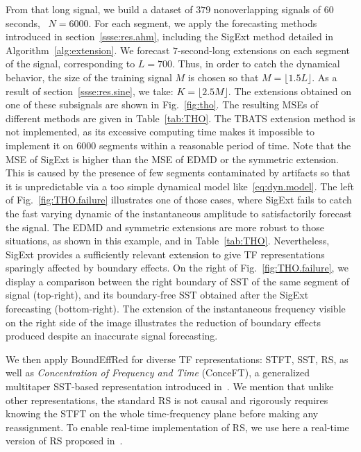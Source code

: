 From that long signal, we build a dataset of $379$ non\-overlapping signals of 60 seconds, \ie~$N=6000$. For each segment, we apply the forecasting methods introduced in section~\ref{ssse:res.ahm}, including the {\sf SigExt} method detailed in Algorithm~\ref{alg:extension}. We forecast $7$-second-long extensions on each segment of the signal, corresponding to $L =700$. Thus, in order to catch the dynamical behavior, the size of the training signal $M$ is chosen so that $M=\lfloor 1.5L\rfloor$. As a result of section~\ref{ssse:res.sine}, we take: $K=\lfloor2.5M\rfloor$. The extensions obtained on one of these subsignals are shown in Fig.~\ref{fig:tho}. The resulting MSEs of different methods are given in Table~\ref{tab:THO}. The TBATS extension method is not implemented, as its excessive computing time makes it impossible to implement it on $6000$ segments within a reasonable period of time.
%
Note that the MSE of {\sf SigExt} is higher than the MSE of EDMD or the symmetric extension. This is caused by the presence of few segments contaminated by artifacts so that it is unpredictable via a too simple dynamical model like~\eqref{eq:dyn.model}. The left of Fig.~\ref{fig:THO.failure} illustrates one of those cases, where {\sf SigExt} fails to catch the fast varying dynamic of the instantaneous amplitude to satisfactorily forecast the signal. The EDMD and symmetric extensions are more robust to those situations, as shown in this example, and in Table~\ref{tab:THO}. Nevertheless, {\sf SigExt} provides a sufficiently relevant extension to give TF representations sparingly affected by boundary effects. On the right of Fig.~\ref{fig:THO.failure}, we display a comparison between the right boundary of SST of the same segment of signal (top-right), and its boundary-free SST obtained after the {\sf SigExt} forecasting (bottom-right). The extension of the instantaneous frequency visible on the right side of the image illustrates the reduction of boundary effects produced despite an inaccurate signal forecasting.

We then apply {\sf BoundEffRed} for diverse TF representations: STFT, SST, RS, as well as \textit{Concentration of Frequency and Time} (ConceFT), a generalized multitaper SST-based representation introduced in~\cite{Daubechies16conceft}.  We mention that unlike other representations, the standard RS is not causal and rigorously requires knowing the STFT on the whole time-frequency plane before making any reassignment. To enable real-time implementation of RS, we use here a real-time version of RS proposed in~\cite{Lin17conceft}.

